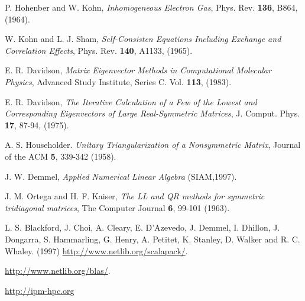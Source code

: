 \documentclass[twocolumn]{article}
\begin{document}

\vspace{1cm}
\hline
\begin{thebibliography}{9}

 P. Hohenber and W. Kohn, \emph{Inhomogeneous Electron Gas}, Phys. Rev. \textbf{136}, B864, (1964).

 W. Kohn and L. J. Sham, \emph{Self-Consisten Equations Including Exchange and Correlation Effects}, Phys. Rev. \textbf{140}, A1133, (1965).

 E. R. Davidson, \emph{Matrix Eigenvector Methods in Computational Molecular Physics}, Advanced Study Institute, Series C. Vol. \textbf{113}, (1983).

 E. R. Davidson, \emph{The Iterative Calculation of a Few of the Lowest and Corresponding Eigenvectors of Large Real-Symmetric Matrices}, J. Comput. Phys. \textbf{17}, 87-94, (1975).

 A. S. Householder. \emph{Unitary Triangularization of a Nonsymmetric Matrix}, Journal of the ACM \textbf{5}, 339-342 (1958).

 J. W. Demmel, \emph{Applied Numerical Linear Algebra} (SIAM,1997).

 J. M. Ortega and H. F. Kaiser, \emph{The LL and QR methods for symmetric tridiagonal matrices}, The Computer Journal \textbf{6}, 99-101 (1963).

 L. S. Blackford, J. Choi, A. Cleary, E. D'Azevedo, J. Demmel, I. Dhillon, J. Dongarra, S. Hammarling, G. Henry, A. Petitet, K. Stanley, D. Walker and R. C. Whaley. (1997) \url{http://www.netlib.org/scalapack/}.

 \url{http://www.netlib.org/blas/}.

 \url{http://ipm-hpc.org}

\end{thebibliography}
\end{document}
